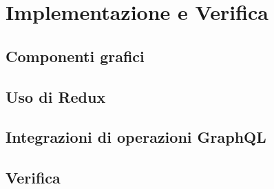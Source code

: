 \chapter{Implementazione e Verifica}

\section{Componenti grafici}

\section{Uso di Redux}


\section{Integrazioni di operazioni GraphQL}

\section{Verifica}